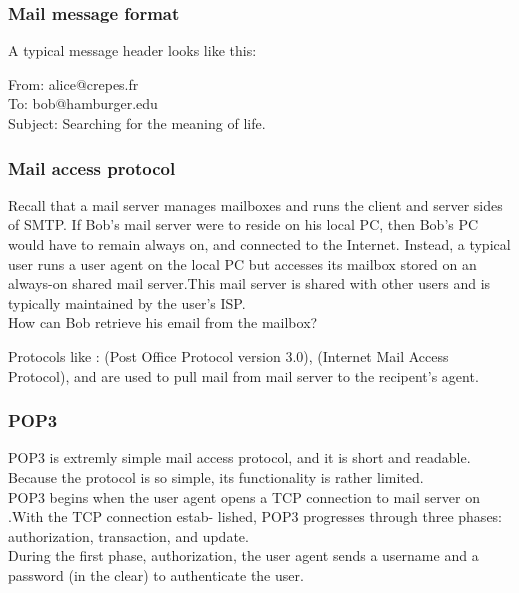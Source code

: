 \subsubsection{Mail message format}

\hf
A typical message header looks like this:
\begin{center}
    From: alice@crepes.fr\\
    To: bob@hamburger.edu\\
    Subject: Searching for the meaning of life.
\end{center}

\subsubsection{Mail access protocol}

\hf
Recall that a mail server manages mailboxes and runs the
client and server sides of SMTP. If Bob's mail server were to reside
on his local PC, then Bob's PC would have to remain always on, and connected
to the Internet. Instead, a typical user runs a user agent on the local PC but accesses
its mailbox stored on an always-on shared mail server.This mail server is shared
with other users and is typically maintained by the user’s ISP.\\

How can Bob retrieve his email from the mailbox?

Protocols like : (Post Office Protocol version 3.0),  (Internet Mail
Access Protocol), and  are used to pull mail from mail server to the recipent's
agent.

\subsubsection{POP3}

\hf POP3 is extremly simple mail access protocol, and it is short and readable. Because the protocol is so simple, its functionality is
rather limited.\\

POP3 begins when the user agent opens a TCP connection to mail server on .With the TCP connection estab-
lished, POP3 progresses through three phases: authorization, transaction, and update.\\

During the first phase, authorization, the user agent sends a username and a password
(in the clear) to authenticate the user.\\



